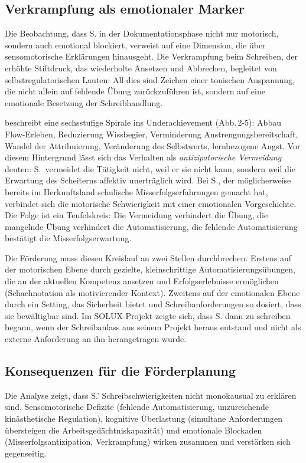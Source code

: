 \documentclass[ngerman, a4paper]{article}
\begin{document}
\subsection{Verkrampfung als emotionaler Marker}

Die Beobachtung, dass S. in der Dokumentationsphase nicht nur motorisch, sondern
auch emotional blockiert, verweist auf eine Dimension, die über sensomotorische
Erklärungen hinausgeht. Die Verkrampfung beim Schreiben, der erhöhte Stiftdruck,
das wiederholte Ansetzen und Abbrechen, begleitet von selbstregulatorischen Lauten:
All dies sind Zeichen einer tonischen Anspannung, die nicht allein auf fehlende
Übung zurückzuführen ist, sondern auf eine emotionale Besetzung der Schreibhandlung.

\textcite[S.\,70--72]{lehwald2017motivation} beschreibt eine sechsstufige
Spirale ins Underachievement (Abb.\,2-5): Abbau Flow-Erleben, Reduzierung
Wissbegier, Verminderung Anstrengungsbereitschaft, Wandel der Attribuierung,
Veränderung des Selbstwerts, lernbezogene Angst. Vor diesem Hintergrund
lässt sich das Verhalten als \textit{antizipatorische Vermeidung} deuten:
S.\ vermeidet die Tätigkeit nicht, weil er sie nicht kann, sondern weil
die Erwartung des Scheiterns affektiv unerträglich wird. Bei S., der
möglicherweise bereits im Herkunftsland schulische Misserfolgserfahrungen
gemacht hat, verbindet sich die motorische Schwierigkeit mit einer
emotionalen Vorgeschichte. Die Folge ist ein Teufelskreis: Die Vermeidung
verhindert die Übung, die mangelnde Übung verhindert die Automatisierung,
die fehlende Automatisierung bestätigt die Misserfolgserwartung.

Die Förderung muss diesen Kreislauf an zwei Stellen durchbrechen. Erstens auf der
motorischen Ebene durch gezielte, kleinschrittige Automatisierungsübungen, die an
der aktuellen Kompetenz ansetzen und Erfolgserlebnisse ermöglichen (Schachnotation
als motivierender Kontext). Zweitens auf der emotionalen Ebene durch ein Setting, das
Sicherheit bietet und Schreibanforderungen so dosiert, dass sie bewältigbar sind. Im
SOLUX-Projekt zeigte sich, dass S. dann zu schreiben begann, wenn der Schreibanlass
aus seinem Projekt heraus entstand und nicht als externe Anforderung an ihn
herangetragen wurde.

\subsection{Konsequenzen für die Förderplanung}

Die Analyse zeigt, dass S.' Schreibschwierigkeiten nicht monokausual zu erklären sind.
Sensomotorische Defizite (fehlende Automatisierung, unzureichende kinästhetische
Regulation), kognitive Überlastung (simultane Anforderungen übersteigen die
Arbeitsgedächtniskapazität) und emotionale Blockaden (Misserfolgsantizipation,
Verkrampfung) wirken zusammen und verstärken sich gegenseitig.
\end{document}
